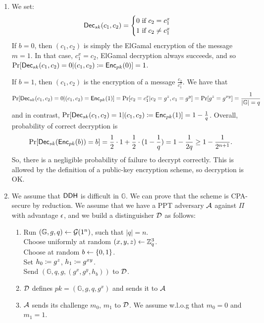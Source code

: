 \begin{solution}
	\begin{enumerate}
		\item We set:
		\[ \operatorname{\mathsf{Dec}}_{sk}(c_1, c_2)=\begin{cases} 0 \text{ if } c_2 = c_1^x \\ 1 \text{ if } c_2 \neq c_1^x \end{cases} \]
		If $b=0$, then $(c_1, c_2)$ is simply the ElGamal encryption of the message $m=1$.
		In that case, $c_1^x=c_2$, ElGamal decryption always succeeds, and so $\Pr[\operatorname{\mathsf{Dec}}_{sk}(c_1, c_2)=0 | (c_1, c_2) \coloneqq \operatorname{\mathsf{Enc}}_{pk}(0)] = 1$.

		If $b=1$, then $(c_1, c_2)$ is the encryption of a message $\frac{c_2}{c_1^x}$.
		We have that
		\[ \Pr[\operatorname{\mathsf{Dec}}_{sk}(c_1, c_2) = 0 | (c_1, c_2) = \operatorname{\mathsf{Enc}}_{pk}(1)] = \Pr[c_2 = c_1^x | c_2 = g^z, c_1 = g^y] = \Pr[g^z=g^{xy}] = \frac{1}{|\mathbb{G}|=q} \]
		and in contrast, $\Pr[\operatorname{\mathsf{Dec}}_{sk}(c_1, c_2)=1 | (c_1, c_2) \coloneqq \operatorname{\mathsf{Enc}}_{pk}(1)]=1-\frac{1}{q}$.
		Overall, probability of correct decryption is
		\[ \Pr[\operatorname{\mathsf{Dec}}_{sk}(\operatorname{\mathsf{Enc}}_{pk}(b))=b] = \frac{1}{2}\cdot 1 + \frac{1}{2}\cdot (1-\frac{1}{q}) = 1-\frac{1}{2q} \ge 1-\frac{1}{2^{n+1}}. \]
		So, there is a negligible probability of failure to decrypt correctly.
		This is allowed by the definition of a public-key encryption scheme, so decryption is OK.

		\item We assume that $\mathsf{DDH}$ is difficult in $\mathbb{G}$.
		We can prove that the scheme is CPA-secure by reduction.
		We assume that we have a PPT adversary $\mathcal{A}$ against $\Pi$ with advantage $\epsilon$, and we build a distinguisher $\mathcal{D}$ as follows:
		\begin{enumerate}[label=(\arabic*)]
			\item Run $(\mathbb{G},g,q) \leftarrow \mathcal{G}(1^n)$, such that $|q|=n$. \\
			Choose uniformly at random $(x,y,z) \leftarrow \mathbb{Z}_q^3$. \\
			Choose at random $b\leftarrow \{0, 1\}$. \\
			Set $h_0 \coloneqq g^z$, $h_1 \coloneqq g^{xy}$. \\
			Send $(\mathbb{G}, q, g, (g^x, g^y, h_b))$ to $\mathcal{D}$.

			\item $\mathcal{D}$ defines $pk = (\mathbb{G},g,q,g^x)$ and sends it to $\mathcal{A}$

			\item $\mathcal{A}$ sends its challenge $m_0$, $m_1$ to $\mathcal{D}$. We assume w.l.o.g that $m_0=0$ and $m_1=1$.


\end{enumerate}
\end{enumerate}
\end{solution}
